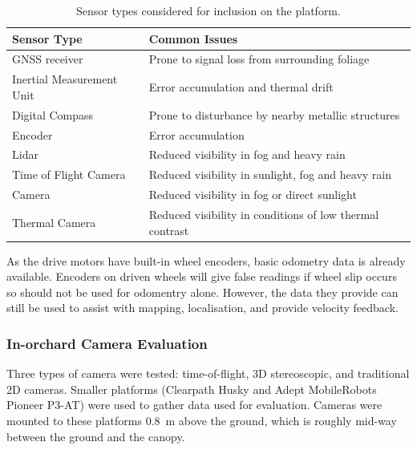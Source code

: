 \documentclass[preprint,authoryear,12pt]{elsarticle}
\begin{document}
    \begin{table}[htbp]
        \centering
        \footnotesize
        \begin{tabular}{ l l}

            \textbf{Sensor Type}      &\textbf{Common Issues} \\ \hline
            GNSS receiver              & Prone to signal loss from surrounding foliage\\  \hline
            Inertial Measurement Unit & Error accumulation and thermal drift\\ \hline
            Digital Compass           & Prone to disturbance by nearby metallic structures\\ \hline
            Encoder                   & Error accumulation \\ \hline
            Lidar                     & Reduced visibility in fog and heavy rain \\ \hline
            Time of Flight Camera     & Reduced visibility in sunlight, fog and heavy rain \\ \hline
            Camera                    & Reduced visibility in fog or direct sunlight \\ \hline
            Thermal Camera            & Reduced visibility in conditions of low thermal contrast\\ \hline
        \end{tabular}
        \caption{Sensor types considered for inclusion on the platform.}
        \label{table:sensor_comparison}
    \end{table}

    As the drive motors have built-in wheel encoders, basic odometry data is already available.
    Encoders on driven wheels will give false readings if wheel slip occurs so should not be used for odomentry alone.
    However, the data they provide can still be used to assist with mapping, localisation, and provide velocity feedback.


    \subsubsection{In-orchard Camera Evaluation}
        \label{sect:camera_evaluation}

        Three types of camera were tested: time-of-flight, 3D stereoscopic, and traditional 2D cameras.
        Smaller platforms (Clearpath Husky and Adept MobileRobots Pioneer P3-AT) were used to gather data used for evaluation.
        Cameras were mounted to these platforms \SI{0.8}{\meter} above the ground, which is roughly mid-way between the ground and the canopy.
\end{document}
